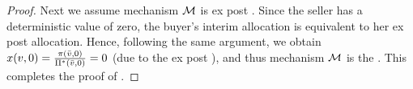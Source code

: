 \begin{proof}
    Next we assume mechanism $\mathcal{M}$ is ex post {\ksfair}. Since the seller has a deterministic value of zero, the buyer's interim allocation is equivalent to her ex post allocation. Hence, following the same argument, we obtain $x(v, 0) = \frac{\pi(\bar{v},0)}{\Pi^*(\bar{v},0)} = 0$ (due to the ex post {\ksfairness}), and thus mechanism $\mathcal{M}$ is the {\NoTrade}. This completes the proof of .
\end{proof}